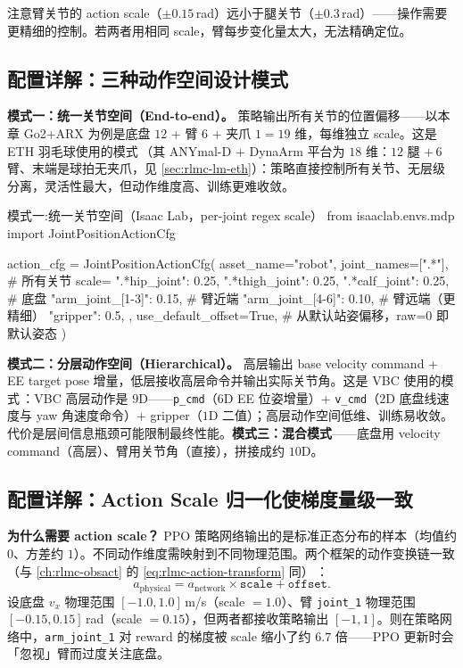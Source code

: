 注意臂关节的 action scale（$\pm0.15\,$rad）远小于腿关节（$\pm0.3\,$rad）——操作需要更精细的控制。若两者用相同 scale，臂每步变化量太大，无法精确定位。

\subsection{配置详解：三种动作空间设计模式}
\label{sec:rlmc-lm-action-modes}

\textbf{模式一：统一关节空间（End-to-end）。} 策略输出所有关节的位置偏移——以本章 Go2+ARX 为例是底盘 $12$ + 臂 $6$ + 夹爪 $1=19$ 维，每维独立 scale。这是 ETH 羽毛球使用的模式\,\cite{ma2025badminton}（其 ANYmal-D + DynaArm 平台为 $18$ 维：$12$ 腿 $+\,6$ 臂、末端是球拍无夹爪，见 \cref{sec:rlmc-lm-eth}）：策略直接控制所有关节、无层级分离，灵活性最大，但动作维度高、训练更难收敛。

\begin{codebox}[Python]{模式一:统一关节空间（Isaac Lab，per-joint regex scale）}
from isaaclab.envs.mdp import JointPositionActionCfg

action_cfg = JointPositionActionCfg(
    asset_name="robot",
    joint_names=[".*"],                  # 所有关节
    scale={
        ".*hip_joint": 0.25, ".*thigh_joint": 0.25, ".*calf_joint": 0.25,  # 底盘
        "arm_joint_[1-3]": 0.15,         # 臂近端
        "arm_joint_[4-6]": 0.10,         # 臂远端（更精细）
        "gripper": 0.5,
    },
    use_default_offset=True,             # 从默认站姿偏移，raw=0 即默认姿态
)
\end{codebox}

\textbf{模式二：分层动作空间（Hierarchical）。} 高层输出 base velocity command + EE target pose 增量，低层接收高层命令并输出实际关节角。这是 VBC 使用的模式\,\cite{liu2024vbc}：VBC 高层动作是 $9$D——\verb|p_cmd|（$6$D EE 位姿增量）+ \verb|v_cmd|（$2$D 底盘线速度与 yaw 角速度命令）+ gripper（$1$D 二值）；高层动作空间低维、训练易收敛。代价是层间信息瓶颈可能限制最终性能。\textbf{模式三：混合模式}——底盘用 velocity command（高层）、臂用关节角（直接），拼接成约 $10$D。

\subsection{配置详解：Action Scale 归一化使梯度量级一致}
\label{sec:rlmc-lm-action-scale}

\textbf{为什么需要 action scale？} PPO 策略网络输出的是标准正态分布的样本（均值约 $0$、方差约 $1$）。不同动作维度需映射到不同物理范围。两个框架的动作变换链一致（与 \cref{ch:rlmc-obsact} 的 \cref{eq:rlmc-action-transform} 同）\,\cite{isaaclab2024,mjlab2026}：
\begin{equation}
a_{\text{physical}} = a_{\text{network}}\times\texttt{scale} + \texttt{offset}.
\label{eq:rlmc-lm-action}
\end{equation}
设底盘 $v_x$ 物理范围 $[-1.0,1.0]\,$m/s（scale $=1.0$）、臂 \verb|joint_1| 物理范围 $[-0.15,0.15]\,$rad（scale $=0.15$），但两者都接收策略输出 $[-1,1]$。则在策略网络中，\verb|arm_joint_1| 对 reward 的梯度被 scale 缩小了约 $6.7$ 倍——PPO 更新时会「忽视」臂而过度关注底盘。

